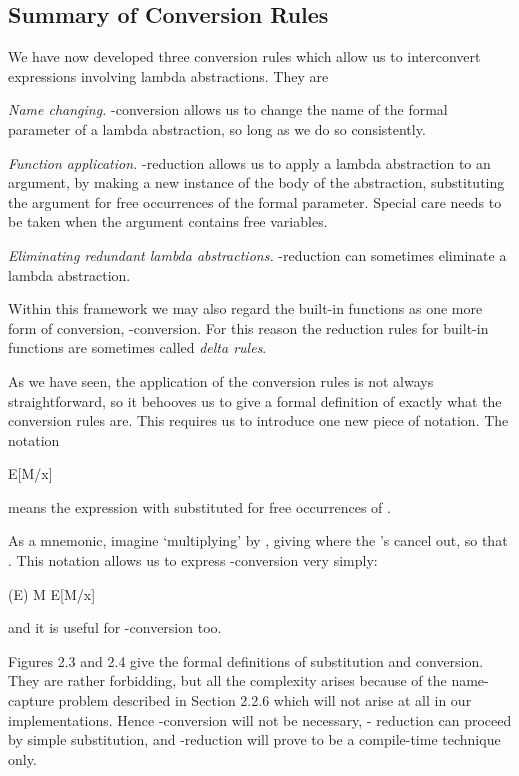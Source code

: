 \subsection{Summary of Conversion Rules}

We have now developed three conversion rules which allow us to interconvert
expressions involving lambda abstractions. They are
\begin{numbered}
    \item \textit{Name changing.} \ta{}-conversion allows us to change the name of the formal
    parameter of a lambda abstraction, so long as we do so consistently.
    \item \textit{Function application.} \tb{}-reduction allows us to apply a lambda abstraction to an argument, by making a new instance of the body of the abstraction, substituting the argument for free occurrences of the formal
    parameter. Special care needs to be taken when the argument contains
    free variables.
    \item \textit{Eliminating redundant lambda abstractions.} \te{}-reduction can sometimes
    eliminate a lambda abstraction.
\end{numbered}
Within this framework we may also regard the built-in functions as one more
form of conversion, \td{}-conversion. For this reason the reduction rules for
built-in functions are sometimes called \textit{delta rules}.

As we have seen, the application of the conversion rules is not always
straightforward, so it behooves us to give a formal definition of exactly what the
conversion rules are. This requires us to introduce one new piece of notation.
The notation
\begin{mlcoded}
    E[M/x]
\end{mlcoded}
means the expression  with  substituted for free occurrences of .

As a mnemonic, imagine `multiplying'  by , giving  where the 's
cancel out, so that . This notation allows us to express
\tb{}-conversion very simply:
\begin{mlcoded}
    (E) M \conversion{\beta} E[M/x]
\end{mlcoded}
and it is useful for \ta{}-conversion too.

Figures 2.3 and 2.4 give the formal definitions of substitution and
conversion. They are rather forbidding, but all the complexity arises because
of the name-capture problem described in Section 2.2.6 which will not arise at
all in our implementations. Hence \ta{}-conversion will not be necessary, \tb{}-
reduction can proceed by simple substitution, and \te{}-reduction will prove to
be a compile-time technique only.

